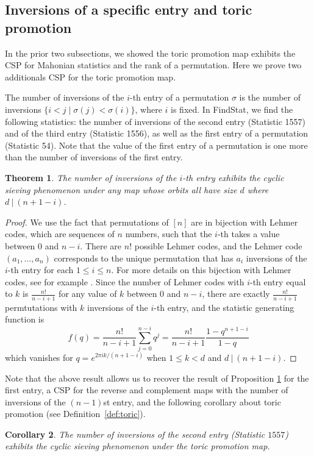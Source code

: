 \documentclass{amsart}
\newtheorem{thm}{Theorem}[section]
\newtheorem{cor}[thm]{Corollary}
\theoremstyle{definition}
\begin{document}
\subsection{Inversions of a specific entry and toric promotion}
In the prior two subsections, we showed the toric promotion map exhibits the CSP for Mahonian statistics and the rank of a permutation. Here we prove two additionals CSP for the toric promotion map.

The number of inversions of the $i$-th entry of a permutation $\sigma$ is the number of inversions $\{ i < j \mid \sigma(j) < \sigma(i)\}$, where $i$ is fixed. In FindStat, we find the following statistics: the number of inversions of the second entry (Statistic 1557) and of the third entry (Statistic 1556), as well as the first entry of a permutation (Statistic 54). Note that the value of the first entry of a permutation is one more than the number of inversions of the first entry.

\begin{thm}\label{thm:ith_entry}
  The number of inversions of the $i$-th entry exhibits the cyclic sieving phenomenon under any map whose orbits all have size $d$ where $d \ | \ (n+1-i)$.
\end{thm}
\begin{proof}
    We use the fact that permutations of $[n]$ are in bijection with Lehmer codes, which are sequences of $n$ numbers, such that the $i$-th takes a value between $0$ and $n-i$. There are $n!$ possible Lehmer codes, and the Lehmer code $(a_1, \ldots, a_n)$ corresponds to the unique permutation that has $a_i$ inversions of the $i$-th entry for each $1 \leq i \leq n$. For more details on this bijection with Lehmer codes, see for example \cite[p.12]{Knuth_AOCP3}.
    Since the number of Lehmer codes with $i$-th entry equal to $k$ is $\frac{n!}{n-i+1}$ for any value of $k$ between $0$ and $n-i$, there are exactly $\frac{n!}{n-i+1}$ permtutations with $k$ inversions of the $i$-th entry, and the statistic generating function is
    \[ f(q) = \frac{n!}{n-i+1}\sum_{j = 0}^{n-i} q^j=\frac{n!}{n-i+1}\frac{1-q^{n+1-i}}{1-q} \]
    which vanishes for $q=e^{2\pi i k/(n+1-i)}$ when $1\leq k < d$ and $d \ | \ (n+1-i)$. 
\end{proof}

Note that the above result allows us to recover the result of Proposition \ref{thm:ith_entry} for the first entry, a CSP for the reverse and complement maps with the number of inversions of the $(n-1)$st entry, and the following corollary about toric promotion (see Definition~\ref{def:toric}).
\begin{cor}\label{cor:toric_pro_2nd_entry}
The number of inversions of the second entry (Statistic $1557$) exhibits the  cyclic sieving phenomenon under the toric promotion map.
\end{cor}
\end{document}
